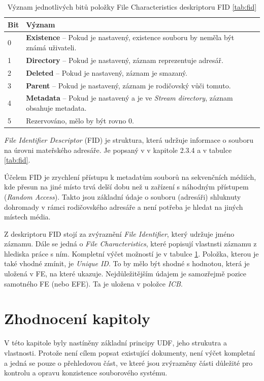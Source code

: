 \begin{table}
    \centering\label{tab:file-characteristics}
    \begin{tabular}{ | l | l |}
        \hline
        Bit & Význam \\ \hline\hline
        0   & \textbf{Existence} -- Pokud je nastavený, existence souboru by neměla být známá uživateli.\\\hline
        1   & \textbf{Directory} -- Pokud je nastavený, záznam reprezentuje adresář.\\\hline
        2   & \textbf{Deleted} -- Pokud je nastavený, záznam je smazaný.\\\hline
        3   & \textbf{Parent} -- Pokud je nastavený, záznam je rodičovský vůči tomuto.\\\hline
        4   & \textbf{Metadata} -- Pokud je nastavený a je ve \textit{Stream directory}, záznam obsahuje metadata.\\\hline
        5   & Rezervováno, mělo by být rovno 0.\\\hline
    \end{tabular}
    \caption{Význam jednotlivých bitů položky File Characteristics deskriptoru FID \ref{tab:fid}}
\end{table}
\textit{File Identifier Descriptor} (FID) je struktura, která udržuje informace o souboru na úrovni mateřského adresáře. Je popsaný v \cite{osta-udf-0201} v kapitole 2.3.4 a v tabulce \ref{tab:fid}.

Účelem FID je zrychlení přístupu k metadatům souborů na sekvenčních médiích, kde přesun na jiné místo trvá delší dobu než u zařízení s náhodným přístupem (\textit{Random Access}). Takto jsou základní údaje o souboru (adresáři) shluknuty dohromady v rámci rodičovského adresáře a není potřeba je hledat na jiných místech média.

Z deskriptoru FID stojí za zvýraznění \textit{File Identifier}, který udržuje jméno záznamu. Dále se jedná o \textit{File Characteristics}, které popisují vlastnsti záznamu z hlediska práce s ním. Kompletní výčet možností je v tabulce \ref{tab:file-characteristics}. Položka, kterou je také vhodné zmínit, je \textit{Unique ID}. To by mělo být shodné s hodnotou, která je uložená v FE, na které ukazuje. Nejdůležitějším údajem je samozřejmě pozice samotného FE (nebo EFE). Ta je uložena v položce \textit{ICB}. 

\section{Zhodnocení kapitoly}
V této kapitole byly nastíněny základní principy UDF, jeho strukutra a vlastnosti. Protože není cílem popsat existující dokumenty, není výčet kompletní a jedná se pouze o přehledovou část, ve které jsou zvýrazněny části důležité pro kontrolu a opravu konzistence souborového systému.

